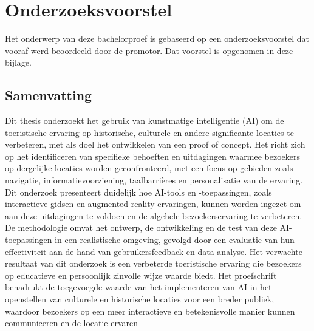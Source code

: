 \documentclass[dutch,dit,thesis]{hogentreport}
\begin{document}







%
%




\appendix

\chapter{Onderzoeksvoorstel}
Het onderwerp van deze bachelorproef is gebaseerd op een onderzoeksvoorstel dat vooraf werd beoordeeld door de promotor. Dat voorstel is opgenomen in deze bijlage.

\section*{Samenvatting}

   
    Dit thesis onderzoekt het gebruik van kunstmatige intelligentie (AI) om de toeristische ervaring op historische, culturele en andere significante locaties te verbeteren, met als doel het ontwikkelen van een proof of concept. Het richt zich op het identificeren van specifieke behoeften en uitdagingen waarmee bezoekers op dergelijke locaties worden geconfronteerd, met een focus op gebieden zoals navigatie, informatievoorziening, taalbarrières en personalisatie van de ervaring.
    Dit onderzoek presenteert duidelijk hoe AI-tools en -toepassingen, zoals interactieve gidsen en augmented reality-ervaringen, kunnen worden ingezet om aan deze uitdagingen te voldoen en de algehele bezoekerservaring te verbeteren. De methodologie omvat het ontwerp, de ontwikkeling en de test van deze AI-toepassingen in een realistische omgeving, gevolgd door een evaluatie van hun effectiviteit aan de hand van gebruikersfeedback en data-analyse.
    Het verwachte resultaat van dit onderzoek is een verbeterde toeristische ervaring die bezoekers op educatieve en persoonlijk zinvolle wijze waarde biedt. Het proefschrift benadrukt de toegevoegde waarde van het implementeren van AI in het openstellen van culturele en historische locaties voor een breder publiek, waardoor bezoekers op een meer interactieve en betekenisvolle manier kunnen communiceren en de locatie ervaren
\end{document}
